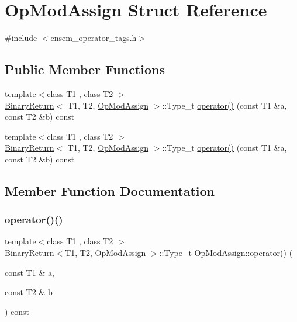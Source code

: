 \hypertarget{structOpModAssign}{}\section{Op\+Mod\+Assign Struct Reference}
\label{structOpModAssign}


{\ttfamily \#include $<$ensem\+\_\+operator\+\_\+tags.\+h$>$}

\subsection*{Public Member Functions}
\begin{DoxyCompactItemize}
\item 
{\footnotesize template$<$class T1 , class T2 $>$ }\\\mbox{\hyperlink{structBinaryReturn}{Binary\+Return}}$<$ T1, T2, \mbox{\hyperlink{structOpModAssign}{Op\+Mod\+Assign}} $>$\+::Type\+\_\+t \mbox{\hyperlink{structOpModAssign_ae4cd6a2eeb0dd164ae1f38821fd596d6}{operator()}} (const T1 \&a, const T2 \&b) const
\item 
{\footnotesize template$<$class T1 , class T2 $>$ }\\\mbox{\hyperlink{structBinaryReturn}{Binary\+Return}}$<$ T1, T2, \mbox{\hyperlink{structOpModAssign}{Op\+Mod\+Assign}} $>$\+::Type\+\_\+t \mbox{\hyperlink{structOpModAssign_ae4cd6a2eeb0dd164ae1f38821fd596d6}{operator()}} (const T1 \&a, const T2 \&b) const
\end{DoxyCompactItemize}


\subsection{Member Function Documentation}
\mbox{\label{structOpModAssign_ae4cd6a2eeb0dd164ae1f38821fd596d6}} 
\subsubsection{\texorpdfstring{operator()()}{operator()()}\hspace{0.1cm}{\footnotesize\ttfamily [1/2]}}
{\footnotesize\ttfamily template$<$class T1 , class T2 $>$ \\
\mbox{\hyperlink{structBinaryReturn}{Binary\+Return}}$<$T1, T2, \mbox{\hyperlink{structOpModAssign}{Op\+Mod\+Assign}} $>$\+::Type\+\_\+t Op\+Mod\+Assign\+::operator() (\begin{DoxyParamCaption}\item[{const T1 \&}]{a,  }\item[{const T2 \&}]{b }\end{DoxyParamCaption}) const\hspace{0.3cm}{\ttfamily [inline]}}

